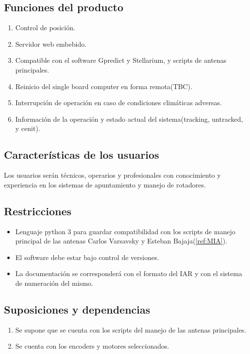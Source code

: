 \documentclass[12pt,a4paper, twosite]{article}
\begin{document}
	\subsection{Funciones del producto}
	\label{sec:orgaf51da6}
	\begin{enumerate}
		\item Control de posición.
		\item Servidor web embebido. 
		\item Compatible con el software Gpredict y Stellarium, y scripts de antenas principales. 
		\item Reinicio del single board computer en forma remota(TBC).  
		\item Interrupción de operación en caso de condiciones climáticas adversas. 
		\item Información de la operación y estado actual del sistema(tracking, untracked, y cenit). 
	\end{enumerate}
	
	\subsection{Características de los usuarios}
	\label{sec:orga40b0ee}
	Los usuarios serán técnicos, operarios y profesionales con conocimiento y experiencia en los sistemas de apuntamiento y manejo de rotadores. 
	\subsection{Restricciones}
	\label{sec:org5ca5790}
	
	
	\begin{itemize}
		
		\item Lenguaje python 3 para guardar compatibilidad con los scripts de manejo principal de las antenas Carlos Varsavsky y Esteban Bajaja(\ref{ref:MIA}).
		\item El software debe estar bajo control de versiones.  
		\item La documentación se corresponderá con el formato del IAR y con el sistema de numeración del mismo.  
		
	\end{itemize}
	
	
	\subsection{Suposiciones y dependencias}
	\label{sec:org0ae23fe}
	\begin{enumerate}
	\item Se supone que se cuenta con los scripts del manejo de las antenas principales.
	\item	Se cuenta con los encoders y motores seleccionados.
	\end{enumerate}
	
\end{document}
